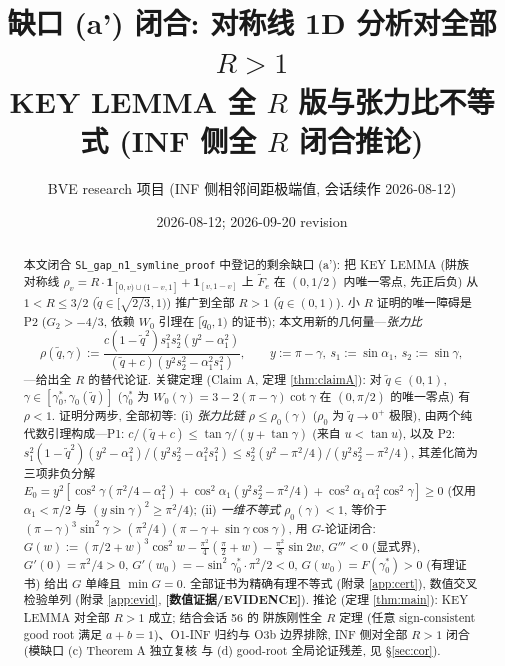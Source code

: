 \documentclass[UTF8]{ctexart}
\title{\texorpdfstring{缺口 (a') 闭合: 对称线 1D 分析对全部 $R>1$\\
\large KEY LEMMA 全 $R$ 版与张力比不等式 (INF 侧全 $R$ 闭合推论)}
{缺口 (a') 闭合: 对称线 1D 分析对全部 R>1; KEY LEMMA 全 R 版与张力比不等式 (INF 侧全 R 闭合推论)}}
\author{BVE research 项目 (INF 侧相邻间距极端值, 会话续作 2026-08-12)}
\date{2026-08-12; 2026-09-20 revision}
\newcommand{\EVID}{\textbf{[数值证据/EVIDENCE]}}
\begin{document}
\maketitle

\begin{abstract}
本文闭合 \texttt{SL\_gap\_n1\_symline\_proof} 中登记的剩余缺口 (a'): 把
KEY LEMMA (阱族对称线 $\rho_v=R\cdot\mathbf1_{[0,v)\cup(1-v,1]}+\mathbf1_{[v,1-v]}$
上 $\widetilde F_e$ 在 $(0,1/2)$ 内唯一零点, 先正后负) 从 $1<R\le3/2$
($\tilde q\in[\sqrt{2/3},1)$) 推广到全部 $R>1$ ($\tilde q\in(0,1)$). 小 $R$
证明的唯一障碍是 P2 ($G_2>-4/3$, 依赖 $W_0$ 引理在 $[\tilde q_0,1)$ 的证书);
本文用新的几何量---\emph{张力比}
\begin{equation*}
	\rho(\tilde q,\gamma):=\frac{c(1-\tilde q^2)s_1^2s_2^2(y^2-\alpha_1^2)}
	{(\tilde q+c)(y^2s_2^2-\alpha_1^2s_1^2)},\qquad
	y:=\pi-\gamma,\ s_1:=\sin\alpha_1,\ s_2:=\sin\gamma,
\end{equation*}
---给出全 $R$ 的替代论证. 关键定理 (Claim A, 定理 \ref{thm:claimA}): 对
$\tilde q\in(0,1)$, $\gamma\in[\gamma_0^*,\gamma_0(\tilde q)]$ ($\gamma_0^*$ 为
$W_0(\gamma)=3-2(\pi-\gamma)\cot\gamma$ 在 $(0,\pi/2)$ 的唯一零点) 有 $\rho<1$.
证明分两步, 全部初等: (i) \emph{张力比链} $\rho\le\rho_0(\gamma)$
($\rho_0$ 为 $\tilde q\to0^+$ 极限), 由两个纯代数引理构成---P1:
$c/(\tilde q+c)\le\tan\gamma/(y+\tan\gamma)$ (来自 $u<\tan u$), 以及 P2:
$s_1^2(1-\tilde q^2)(y^2-\alpha_1^2)/(y^2s_2^2-\alpha_1^2s_1^2)\le
s_2^2(y^2-\pi^2/4)/(y^2s_2^2-\pi^2/4)$, 其差化简为三项非负分解
$E_0=y^2[\cos^2\gamma(\pi^2/4-\alpha_1^2)+\cos^2\alpha_1(y^2s_2^2-\pi^2/4)
+\cos^2\alpha_1\,\alpha_1^2\cos^2\gamma]\ge0$ (仅用 $\alpha_1<\pi/2$ 与
$(y\sin\gamma)^2\ge\pi^2/4$); (ii) \emph{一维不等式} $\rho_0(\gamma)<1$, 等价于
$(\pi-\gamma)^3\sin^2\gamma>(\pi^2/4)(\pi-\gamma+\sin\gamma\cos\gamma)$, 用
$G$-论证闭合: $G(w):=(\pi/2+w)^3\cos^2w-\frac{\pi^2}{4}(\frac\pi2+w)
-\frac{\pi^2}{8}\sin2w$, $G'''<0$ (显式界), $G'(0)=\pi^2/4>0$,
$G'(w_0)=-\sin^2\gamma_0^*\cdot\pi^2/2<0$, $G(w_0)=F(\gamma_0^*)>0$
(有理证书) 给出 $G$ 单峰且 $\min G=0$. 全部证书为精确有理不等式
(附录 \ref{app:cert}), 数值交叉检验单列 (附录 \ref{app:evid}, \EVID{}).
推论 (定理 \ref{thm:main}): KEY LEMMA 对全部 $R>1$ 成立; 结合会话 56 的
阱族刚性全 $R$ 定理 (任意 sign-consistent good root 满足 $a+b=1$)、O1-INF
归约与 O3b 边界排除, INF 侧对全部 $R>1$ 闭合 (模缺口 (c) Theorem A 独立复核
与 (d) good-root 全局论证残差, 见 \S\ref{sec:cor}).
\end{abstract}

\tableofcontents
\end{document}
